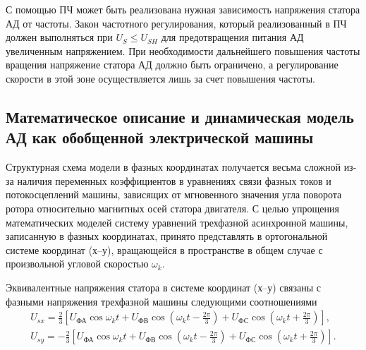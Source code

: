         С помощью ПЧ может быть реализована нужная зависимость напряжения
        статора АД от частоты. Закон частотного регулирования, который
        реализованный в ПЧ должен выполняться при $U_S \leq U_{SH}$ для
        предотвращения питания АД увеличенным напряжением. При необходимости
        дальнейшего повышения частоты вращения напряжение статора АД должно
        быть ограничено, а регулирование скорости в этой зоне осуществляется
        лишь за счет повышения частоты.

    \subsection{Математическое описание и динамическая модель АД как обобщенной
        электрической машины}

        Структурная схема модели в фазных координатах получается весьма сложной
        из-за наличия переменных коэффициентов в уравнениях связи фазных токов
        и потокосцеплений машины, зависящих от мгновенного значения угла
        поворота ротора относительно магнитных осей статора двигателя. С целью
        упрощения математических моделей систему уравнений трехфазной
        асинхронной машины, записанную в фазных координатах, принято
        представлять в ортогональной системе координат (х–у), вращающейся в
        пространстве в общем случае с произвольной угловой скоростью $\omega_k$.

        Эквивалентные напряжения статора в системе координат (х–у) связаны с
        фазными напряжения трехфазной машины следующими соотношениями
        \begin{gather*}
            U_{sx} = \frac{2}{3} \left[ U_\text{ФА}\cos\omega_k t+U_\text{ФВ}
                \cos\left(\omega_k t-\frac{2\pi}{3}\right)+U_\text{ФС} \cos
                    \left( \omega_k t+\frac{2\pi}{3}\right)\right],\\
            U_{sy} = -\frac{2}{3} \left[ U_\text{ФА}\cos\omega_k t+U_\text{ФВ}
                \cos\left(\omega_k t-\frac{2\pi}{3}\right)+U_\text{ФС} \cos
                    \left( \omega_k t+\frac{2\pi}{3}\right)\right].\\
        \end{gather*}

